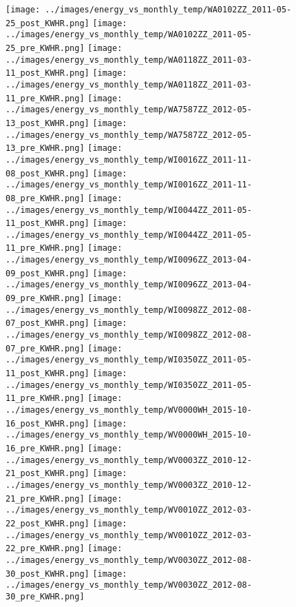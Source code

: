 \clearpage
\begin{figure}
\centering
\texttt{[image: ../images/energy\_vs\_monthly\_temp/WA0102ZZ\_2011-05-25\_post\_KWHR.png]}
\texttt{[image: ../images/energy\_vs\_monthly\_temp/WA0102ZZ\_2011-05-25\_pre\_KWHR.png]}
\texttt{[image: ../images/energy\_vs\_monthly\_temp/WA0118ZZ\_2011-03-11\_post\_KWHR.png]}
\texttt{[image: ../images/energy\_vs\_monthly\_temp/WA0118ZZ\_2011-03-11\_pre\_KWHR.png]}
\texttt{[image: ../images/energy\_vs\_monthly\_temp/WA7587ZZ\_2012-05-13\_post\_KWHR.png]}
\texttt{[image: ../images/energy\_vs\_monthly\_temp/WA7587ZZ\_2012-05-13\_pre\_KWHR.png]}
\texttt{[image: ../images/energy\_vs\_monthly\_temp/WI0016ZZ\_2011-11-08\_post\_KWHR.png]}
\texttt{[image: ../images/energy\_vs\_monthly\_temp/WI0016ZZ\_2011-11-08\_pre\_KWHR.png]}
\texttt{[image: ../images/energy\_vs\_monthly\_temp/WI0044ZZ\_2011-05-11\_post\_KWHR.png]}
\texttt{[image: ../images/energy\_vs\_monthly\_temp/WI0044ZZ\_2011-05-11\_pre\_KWHR.png]}
\texttt{[image: ../images/energy\_vs\_monthly\_temp/WI0096ZZ\_2013-04-09\_post\_KWHR.png]}
\texttt{[image: ../images/energy\_vs\_monthly\_temp/WI0096ZZ\_2013-04-09\_pre\_KWHR.png]}
\texttt{[image: ../images/energy\_vs\_monthly\_temp/WI0098ZZ\_2012-08-07\_post\_KWHR.png]}
\texttt{[image: ../images/energy\_vs\_monthly\_temp/WI0098ZZ\_2012-08-07\_pre\_KWHR.png]}
\texttt{[image: ../images/energy\_vs\_monthly\_temp/WI0350ZZ\_2011-05-11\_post\_KWHR.png]}
\texttt{[image: ../images/energy\_vs\_monthly\_temp/WI0350ZZ\_2011-05-11\_pre\_KWHR.png]}
\texttt{[image: ../images/energy\_vs\_monthly\_temp/WV0000WH\_2015-10-16\_post\_KWHR.png]}
\texttt{[image: ../images/energy\_vs\_monthly\_temp/WV0000WH\_2015-10-16\_pre\_KWHR.png]}
\texttt{[image: ../images/energy\_vs\_monthly\_temp/WV0003ZZ\_2010-12-21\_post\_KWHR.png]}
\texttt{[image: ../images/energy\_vs\_monthly\_temp/WV0003ZZ\_2010-12-21\_pre\_KWHR.png]}
\texttt{[image: ../images/energy\_vs\_monthly\_temp/WV0010ZZ\_2012-03-22\_post\_KWHR.png]}
\texttt{[image: ../images/energy\_vs\_monthly\_temp/WV0010ZZ\_2012-03-22\_pre\_KWHR.png]}
\texttt{[image: ../images/energy\_vs\_monthly\_temp/WV0030ZZ\_2012-08-30\_post\_KWHR.png]}
\texttt{[image: ../images/energy\_vs\_monthly\_temp/WV0030ZZ\_2012-08-30\_pre\_KWHR.png]}
\end{figure}

